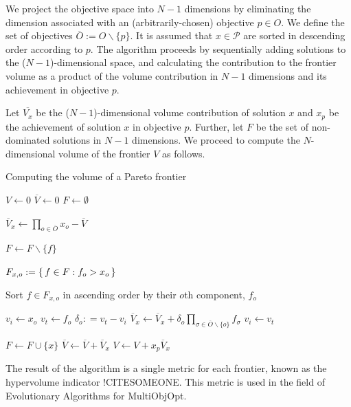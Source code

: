 We project the objective space into $N-1$ dimensions by eliminating the dimension associated with an (arbitrarily-chosen) objective $p \in O$. We define the set of objectives $\overbar{O} := O \backslash \{p\}$. It is assumed that $x \in \mathcal{P}$ are sorted in descending order according to $p$. The algorithm proceeds by sequentially adding solutions to the ($N-1$)-dimensional space, and calculating the contribution to the frontier volume as a product of the volume contribution in $N-1$ dimensions and its achievement in objective $p$.

Let
$\overbar{V_x}$ be the ($N-1$)-dimensional volume contribution of solution $x$ and
$x_p$ be the achievement of solution $x$ in objective $p$. Further, let
$F$ be the set of non-dominated solutions in $N-1$ dimensions.
We proceed to compute the $N$-dimensional volume of the frontier $V$ as follows.

\begin{algorithm}[!ht]
\caption{Computing the volume of a Pareto frontier}
\begin{algorithmic}[1]

\State $V \gets 0$
\State $\overbar{V} \gets 0$
\State $F \gets \emptyset$


	\State $\overbar{V}_x \gets \prod_{o \in \overbar{O}} x_{o} - \overbar{V}$
		
			\State $F \gets F \backslash \{f\}$
		\EndIf
	\EndFor
	
	
		\State $F_{x,o} := \set{f \in F : f_o > x_o}$
		
		\State Sort $f \in F_{x,o}$ in ascending order by their $o$th component, $f_o$
		
		\State $v_i \gets x_o$
			\State $v_t \gets f_o$
			\State $\delta_o :	= v_t - v_i$
			\State $\overbar{V}_x \gets \overbar{V}_x + \delta_o \prod_{\sigma \in \overbar{O} \backslash \{o\}} f_\sigma$
			\State $v_i \gets v_t$
		\EndFor
		
	\EndFor
	
	\State $F \gets F \cup \{x\}$
	\State $\overbar{V} \gets \overbar{V} + \overbar{V}_x$
	\State $V \gets V + x_p \overbar{V}_x$
\EndFor


\end{algorithmic}
\end{algorithm}

The result of the algorithm is a single metric for each frontier, known as the hypervolume indicator !CITESOMEONE. This metric is used in the field of Evolutionary Algorithms for MultiObjOpt. 